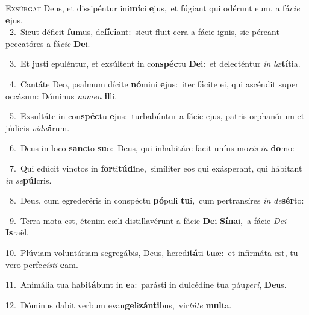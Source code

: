 \lettrine{\initial\textcolor{\initialcolor}{E}}{xsúrgat} Deus, et dissipéntur ini\-\textbf{mí}\-ci \textbf{e}\-jus,~\star et fúgiant qui odérunt eum, a fá\-\textit{ci}\-\textit{e} \textbf{e}\-jus.\\
{\numbfont\textcolor{\numbcolor}{~2.}}~Sicut déficit \textbf{fu}\-mus, de\-\textbf{fí}\-\textbf{ci}ant:~\star sicut fluit cera a fácie ignis, sic péreant peccatóres a fá\-\textit{ci}\-\textit{e} \textbf{De}\-i.\par
{\numbfont\textcolor{\numbcolor}{~3.}}~Et justi epuléntur, et exsúltent in con\-\textbf{spéc}\-tu \textbf{De}\-i:~\star et delecténtur \textit{in} \textit{læ}\-\textbf{tí}tia.\par
{\numbfont\textcolor{\numbcolor}{~4.}}~Cantáte Deo, psalmum dícite \textbf{nó}\-mini \textbf{e}\-jus:~\star iter fácite ei, qui ascéndit super occásum: Dóminus \textit{no}\-\textit{men} \textbf{il}\-li.\par
{\numbfont\textcolor{\numbcolor}{~5.}}~Exsultáte in con\-\textbf{spéc}\-tu \textbf{e}\-jus:~\star turbabúntur a fácie ejus, patris orphanórum et júdicis \textit{vi}\-\textit{du}\textbf{á}rum.\par
{\numbfont\textcolor{\numbcolor}{~6.}}~Deus in loco \textbf{sanc}\-to \textbf{su}\-o:~\star Deus, qui inhabitáre facit uníus mo\textit{ris} \textit{in} \textbf{do}\-mo:\par
{\numbfont\textcolor{\numbcolor}{~7.}}~Qui edúcit vinctos in \textbf{for}\-ti\-\textbf{tú}\-\textbf{di}ne,~\star simíliter eos qui exásperant, qui hábitant \textit{in} \textit{se}\-\textbf{púl}cris.\par
{\numbfont\textcolor{\numbcolor}{~8.}}~Deus, cum egrederéris in conspéctu \textbf{pó}\-puli \textbf{tu}\-i,~\star cum pertransíres \textit{in} \textit{de}\-\textbf{sér}to:\par
{\numbfont\textcolor{\numbcolor}{~9.}}~Terra mota est, étenim cæli distillavérunt a fácie \textbf{De}\-i \textbf{Sí}\-\textbf{na}i,~\star a fácie \textit{De}\-\textit{i} \textbf{Is}\-raël.\par
{\numbfont\textcolor{\numbcolor}{10.}}~Plúviam voluntáriam segregábis, Deus, heredi\-\textbf{tá}\-ti \textbf{tu}\-æ:~\star et infirmáta est, tu vero perfe\-\textit{cís}\-\textit{ti} \textbf{e}\-am.\par
{\numbfont\textcolor{\numbcolor}{11.}}~Animália tua habi\-\textbf{tá}\-bunt in \textbf{e}\-a:~\star parásti in dulcédine tua páu\-\textit{pe}\-\textit{ri}, \textbf{De}\-us.\par
{\numbfont\textcolor{\numbcolor}{12.}}~Dóminus dabit verbum evan\-\textbf{ge}\-li\-\textbf{zán}\-\textbf{ti}bus,~\star vir\-\textit{tú}\-\textit{te} \textbf{mul}\-ta.\par
